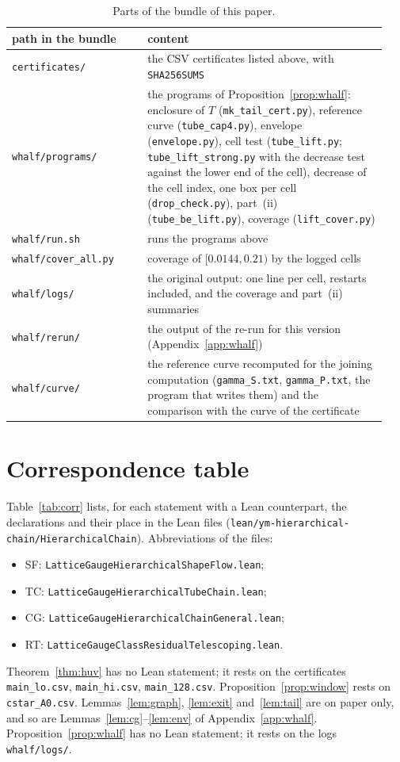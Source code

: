 \documentclass[11pt,a4paper]{article}
\theoremstyle{definition}
\theoremstyle{remark}
\newcommand{\code}[1]{\texttt{#1}}
\begin{document}
\begin{table}[ht]\centering\small
\begin{tabular}{@{}p{0.34\linewidth}p{0.6\linewidth}@{}}
\toprule
path in the bundle & content \\
\midrule
\code{certificates/} & the CSV certificates listed above, with \code{SHA256SUMS} \\
\code{whalf/programs/} & the programs of Proposition~\ref{prop:whalf}: enclosure of $T$ (\code{mk\_tail\_cert.py}), reference curve (\code{tube\_cap4.py}), envelope (\code{envelope.py}), cell test (\code{tube\_lift.py}; \code{tube\_lift\_strong.py} with the decrease test against the lower end of the cell), decrease of the cell index, one box per cell (\code{drop\_check.py}), part~(ii) (\code{tube\_be\_lift.py}), coverage (\code{lift\_cover.py}) \\
\code{whalf/run.sh} & runs the programs above \\
\code{whalf/cover\_all.py} & coverage of $[0.0144,0.21)$ by the logged cells \\
\code{whalf/logs/} & the original output: one line per cell, restarts included, and the coverage and part~(ii) summaries \\
\code{whalf/rerun/} & the output of the re-run for this version (Appendix~\ref{app:whalf}) \\
\code{whalf/curve/} & the reference curve recomputed for the joining computation (\code{gamma\_S.txt}, \code{gamma\_P.txt}, the program that writes them) and the comparison with the curve of the certificate \\
\bottomrule
\end{tabular}
\caption{Parts of the bundle of this paper.}\label{tab:bundle}
\end{table}

\section{Correspondence table}\label{sec:corr}
Table~\ref{tab:corr} lists, for each statement with a Lean counterpart, the declarations and their place in the Lean files (\code{lean/\allowbreak{}ym-hierarchical-chain/\allowbreak{}HierarchicalChain}).
Abbreviations of the files:
\begin{itemize}[nosep]
\item SF: \code{LatticeGaugeHierarchicalShapeFlow.lean};
\item TC: \code{LatticeGaugeHierarchicalTubeChain.lean};
\item CG: \code{LatticeGaugeHierarchicalChainGeneral.lean};
\item RT: \code{LatticeGaugeClassResidualTelescoping.lean}.
\end{itemize}
Theorem~\ref{thm:huv} has no Lean statement; it rests on the certificates \code{main\_lo.csv}, \code{main\_hi.csv}, \code{main\_128.csv}.
Proposition~\ref{prop:window} rests on \code{cstar\_A0.csv}.
Lemmas~\ref{lem:graph}, \ref{lem:exit} and~\ref{lem:tail} are on paper only, and so are Lemmas~\ref{lem:cg}--\ref{lem:env} of Appendix~\ref{app:whalf}. Proposition~\ref{prop:whalf} has no Lean statement; it rests on the logs \code{whalf/logs/}.
\end{document}
